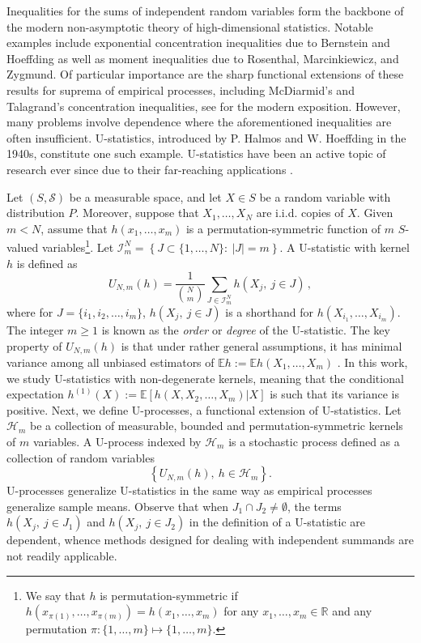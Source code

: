 \documentclass[12pt]{article}
\def\l{\left}
\def\r{\right}
\newcommand{\m}{\mathcal}
\newcommand{\mb}{\mathbb}
\theoremstyle{thmstyletwo}%
\theoremstyle{thmstylethree}%
\begin{document}
Inequalities for the sums of independent random variables form the backbone of the modern non-asymptotic theory of high-dimensional statistics. Notable examples include exponential concentration inequalities due to Bernstein and Hoeffding as well as moment inequalities due to Rosenthal, Marcinkiewicz, and Zygmund. Of particular importance are the sharp functional extensions of these results for suprema of empirical processes, including McDiarmid's and Talagrand's concentration inequalities, see \citep[][]{boucheron2013concentration} for the modern exposition. However, many problems involve dependence where the aforementioned inequalities are often insufficient. 
U-statistics, introduced by P. Halmos \citep{halmos1946theory} and W. Hoeffding \citep{hoeffding1948class} in the 1940s, constitute one such example. U-statistics have been an active topic of research ever since due to their far-reaching applications \citep{serfling2009approximation,lee2019u}. 

Let $(S,\m S)$ be a measurable space, and let $X\in S$ be a random variable with distribution $P$. Moreover, suppose that $X_1,\ldots,X_N$ are i.i.d. copies of $X$. Given $m<N$, assume that $h(x_1,\ldots,x_m)$ is a permutation-symmetric function of $m$ $S$-valued variables\footnote{We say that $h$ is permutation-symmetric if $h(x_{\pi(1)},\ldots,x_{\pi(m)}) = h(x_1,\ldots,x_m)$ for any $x_1,\ldots,x_m\in \mb R$ and any permutation $\pi:\{1,\ldots,m\}\mapsto \{1,\ldots,m\}$.}. Let $\mathcal{I}^N_m = \l\{ J\subset \{1,\ldots,N\}: \ |J|=m\r\}$. A U-statistic with kernel $h$ is defined as 
\[
U_{N,m}(h) = \frac{1}{{N \choose m}} \sum_{J \in \mathcal{I}^N_m} h\l(X_j,\  j \in J\r)\,,
\]
where for $J=\{i_1,i_2,\ldots,i_m\}$, $h\l(X_j,\  j \in J\r)$ is a shorthand for $h\left(X_{i_1},\ldots,X_{i_m}\right)$. The integer $m\geq 1$ is known as the \emph{order} or \emph{degree} of the U-statistic. The key property of $U_{N,m}(h)$ is that under rather general assumptions, it has minimal variance among all unbiased estimators of $\mb Eh:=\mb Eh(X_1,\ldots,X_m)$ \citep{lee2019u}. 
In this work, we study U-statistics with non-degenerate kernels, meaning that the conditional expectation $h^{(1)}(X):=\mb E \l[ h(X,X_2,\ldots,X_m)|X\r]$ is such that its variance is positive. 
Next, we define U-processes, a functional extension of U-statistics. 
Let $\m H_m$ be a collection of measurable, bounded and permutation-symmetric kernels of $m$ variables. A U-process indexed by $\m H_m$ is a stochastic process defined as a collection of random variables
\[
\l\{U_{N,m}(h), \ h\in \m H_m\r\}.
\]
U-processes generalize U-statistics in the same way as empirical processes generalize sample means. 
Observe that when $J_1\cap J_2\ne \emptyset$, the terms $h\l(X_j,\  j \in J_1\r)$ and $h\l(X_j,\  j \in J_2\r)$ in the definition of a U-statistic are dependent, whence methods designed for dealing with independent summands are not readily applicable. 
\end{document}
